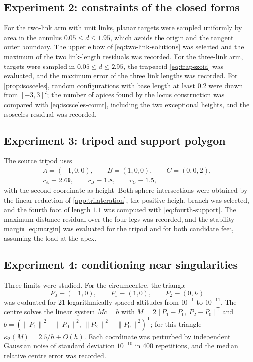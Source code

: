 \documentclass[11pt,a4paper]{article}
\theoremstyle{plain}
\theoremstyle{definition}
\theoremstyle{remark}
\newcommand{\T}{\mathsf{T}}
\newcommand{\norm}[1]{\left\lVert#1\right\rVert}
\begin{document}
\subsection{Experiment 2: constraints of the closed forms}

For the two-link arm with unit links, \TwoLinkTrials{} planar targets were
sampled uniformly by area in the annulus $0.05\le d\le1.95$, which avoids the
origin and the tangent outer boundary. The upper elbow of
\cref{eq:two-link-solutions} was selected and the maximum of the two link-length
residuals was recorded. For the three-link arm, \ThreeLinkTrials{} targets were
sampled in $0.05\le d\le2.95$, the trapezoid \cref{eq:trapezoid} was evaluated,
and the maximum error of the three link lengths was recorded. For
\cref{prop:isosceles}, \IsoTrials{} random configurations with base length at
least $0.2$ were drawn from $[-3,3]^2$; the number of apices found by the locus
construction was compared with \cref{eq:isosceles-count}, including the two
exceptional heights, and the isosceles residual was recorded.

\subsection{Experiment 3: tripod and support polygon}

The source tripod uses
\begin{equation}
  \begin{gathered}
    A=(-1,0,0),\qquad B=(1,0,0),\qquad C=(0,0,2),\\
    r_A=2.69,\qquad r_B=1.8,\qquad r_C=1.5,
  \end{gathered}
\end{equation}
with the second coordinate as height. Both sphere intersections were obtained
by the linear reduction of \cref{app:trilateration}, the positive-height branch
was selected, and the fourth foot of length $1.1$ was computed with
\cref{eq:fourth-support}. The maximum distance residual over the four legs was
recorded, and the stability margin \cref{eq:margin} was evaluated for the
tripod and for both candidate feet, assuming the load at the apex.

\subsection{Experiment 4: conditioning near singularities}\label{sec:conditioning}

Three limits were studied. For the circumcentre, the triangle
\begin{equation}
  P_0=(-1,0),\qquad P_1=(1,0),\qquad P_2=(0,h)
  \label{eq:thin-triangle}
\end{equation}
was evaluated for 21 logarithmically spaced altitudes from $10^{-1}$ to
$10^{-11}$. The centre solves the linear system $Mc=b$ with
$M=2\,[P_1-P_0,\ P_2-P_0]^{\T}$ and
$b=(\norm{P_1}^2-\norm{P_0}^2,\ \norm{P_2}^2-\norm{P_0}^2)^{\T}$; for this
triangle $\kappa_2(M)=2.5/h+O(h)$. Each coordinate was perturbed by independent
Gaussian noise of standard deviation $10^{-10}$ in 400 repetitions, and the
median relative centre error was recorded.
\end{document}
